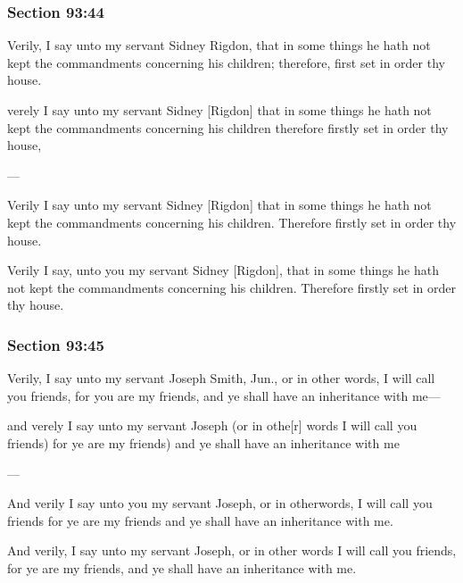 	\subsubsection{Section 93:44} %
		\label{DC93-44}

		Verily, I say unto my servant Sidney Rigdon, that in some things he hath not kept the commandments concerning his children; therefore, first set in order thy house.

		\begin{framed}
		\scriptsize
			\begin{compactdesc}
				\item[JSP] verely I say unto my servant Sidney [Rigdon] that in some things he hath not kept the commandments concerning his children therefore firstly set in order thy house,
				\item[BC] ---
				\item[RB2] Verily I say unto my servant Sidney [Rigdon] that in some things he hath not kept the commandments concerning his children. Therefore firstly set in order thy house. 
				\item[RB1] Verily I say, unto you my servant Sidney [Rigdon], that in some things he hath not kept the commandments concerning his children. Therefore firstly set in order thy house. 
			\end{compactdesc}
		\end{framed}

	\subsubsection{Section 93:45} %
		\label{DC93-45}

		Verily, I say unto my servant Joseph Smith, Jun., or in other words, I will call you friends, for you are my friends, and ye shall have an inheritance with me---

		\begin{framed}
		\scriptsize
			\begin{compactdesc}
				\item[JSP] and verely I say unto my servant Joseph (or in othe[r] words I will call you friends) for ye are my friends) and ye shall have an inheritance with me
				\item[BC] ---
				\item[RB2] And verily I say unto you my servant Joseph, or in otherwords, I will call you friends for ye are my friends and ye shall have an inheritance with me. 
				\item[RB1] And verily, I say unto my servant Joseph, or in other words I will call you friends, for ye are my friends, and ye shall have an inheritance with me. 
			\end{compactdesc}
		\end{framed}

